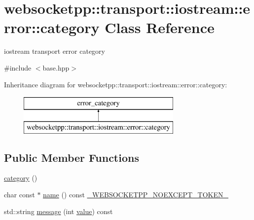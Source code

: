 \hypertarget{classwebsocketpp_1_1transport_1_1iostream_1_1error_1_1category}{}\section{websocketpp\+:\+:transport\+:\+:iostream\+:\+:error\+:\+:category Class Reference}
\label{classwebsocketpp_1_1transport_1_1iostream_1_1error_1_1category}


iostream transport error category  




{\ttfamily \#include $<$base.\+hpp$>$}

Inheritance diagram for websocketpp\+:\+:transport\+:\+:iostream\+:\+:error\+:\+:category\+:\begin{figure}[H]
\begin{center}
\leavevmode
\includegraphics[height=2.000000cm]{classwebsocketpp_1_1transport_1_1iostream_1_1error_1_1category}
\end{center}
\end{figure}
\subsection*{Public Member Functions}
\begin{DoxyCompactItemize}
\item 
\hyperlink{classwebsocketpp_1_1transport_1_1iostream_1_1error_1_1category_afc26564130aecc3d3984536435371df5}{category} ()
\item 
char const $\ast$ \hyperlink{classwebsocketpp_1_1transport_1_1iostream_1_1error_1_1category_a64f1fd16853587d751680244b8d105c6}{name} () const \hyperlink{boost__config_8hpp_aa19747404a5f2fe9c9eb9e9d2e48f26c}{\+\_\+\+W\+E\+B\+S\+O\+C\+K\+E\+T\+P\+P\+\_\+\+N\+O\+E\+X\+C\+E\+P\+T\+\_\+\+T\+O\+K\+E\+N\+\_\+}
\item 
std\+::string \hyperlink{classwebsocketpp_1_1transport_1_1iostream_1_1error_1_1category_afc182935da3ccf1c8965e5634c21a1b8}{message} (int \hyperlink{namespacewebsocketpp_1_1transport_1_1iostream_1_1error_a647b428e260748d7606c92255e1e9737}{value}) const 
\end{DoxyCompactItemize}


